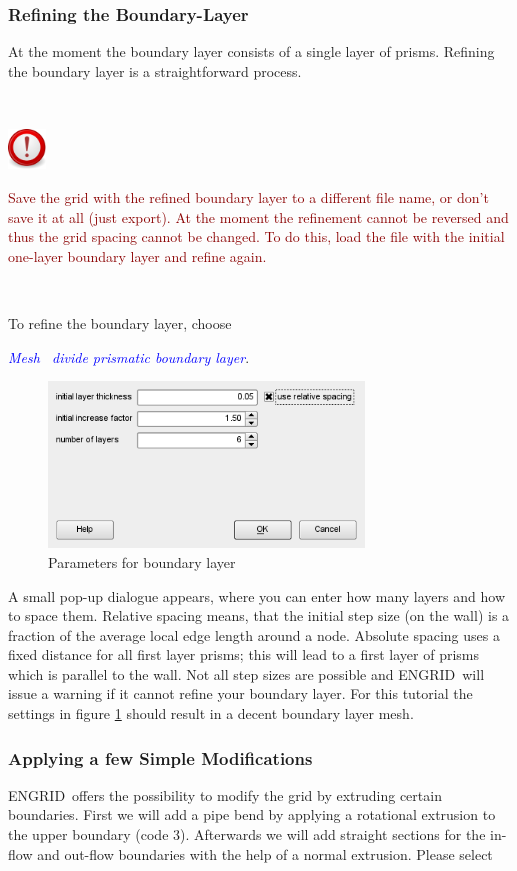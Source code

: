 \documentclass[10pt,a4paper,british]{book}
\newcommand\eg{ENGRID\ }
\newcommand\arr{\guillemotright\ }
\newcommand\menu[1]{\textcolor{blue}{\it \hspace{5mm} #1}}
\newcommand\important[1]
{
  $~$\\
  \begin{minipage}{15mm}
    \includegraphics[width=1cm]{figures/important}
  \end{minipage}
  \begin{minipage}{110mm}
    \begin{flushleft}
      {\textcolor{darkred}{#1}}
    \end{flushleft}
  \end{minipage}
  \\
  \vspace{3mm}
}
\begin{document}
\clearpage
\subsubsection{Refining the Boundary-Layer}
At the moment the boundary layer consists of a single layer of prisms. Refining the boundary layer is a straightforward process. 

\important
{
  Save the grid with the refined boundary layer to
  a different file name, or don't save it at all (just export). At the
  moment the refinement cannot be reversed and thus the grid spacing
  cannot be changed. To do this, load the file with the initial one-layer
  boundary layer and refine again.
}

To refine the boundary layer, choose

\menu{Mesh \arr divide prismatic boundary layer}.
\begin{figure}
  \begin{centering}
    \includegraphics[width=84mm]{figures/tutorials/T1/scr05}
    \par
  \end{centering}
  \caption{Parameters for boundary layer}
  \label{fig:T1_scr05}
\end{figure}

A small pop-up dialogue appears, where you can enter how many layers and how to space them. Relative spacing means, that the initial step size (on the wall) is a fraction of the average local edge length around a node. Absolute spacing uses a fixed distance for all first layer prisms; this will lead to a first layer of prisms which is parallel to the wall. Not all step sizes are possible and \eg will issue a warning if it cannot refine your boundary layer. For this tutorial the settings in figure \ref{fig:T1_scr05} should result in a decent boundary layer mesh.

\clearpage
\subsubsection{Applying a few Simple Modifications}
\eg offers the possibility to modify the grid by extruding certain boundaries. First we will add a pipe bend by applying a rotational extrusion to the upper boundary (code 3). Afterwards we will add straight sections for the in-flow and out-flow boundaries with the help of a normal extrusion. Please select
\end{document}
